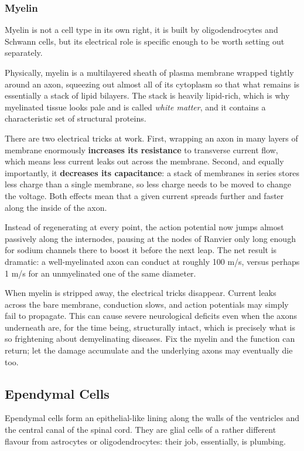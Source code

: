 \documentclass[11pt]{article}
\begin{document}
\subsubsection{Myelin}

Myelin is not a cell type in its own right, it is built by oligodendrocytes and Schwann cells, but its electrical role is specific enough to be worth setting out separately.

Physically, myelin is a multilayered sheath of plasma membrane wrapped tightly around an axon, squeezing out almost all of its cytoplasm so that what remains is essentially a stack of lipid bilayers. The stack is heavily lipid-rich, which is why myelinated tissue looks pale and is called \textit{white matter}, and it contains a characteristic set of structural proteins.

There are two electrical tricks at work. First, wrapping an axon in many layers of membrane enormously \textbf{increases its resistance} to transverse current flow, which means less current leaks out across the membrane. Second, and equally importantly, it \textbf{decreases its capacitance}: a stack of membranes in series stores less charge than a single membrane, so less charge needs to be moved to change the voltage. Both effects mean that a given current spreads further and faster along the inside of the axon.

Instead of regenerating at every point, the action potential now jumps almost passively along the internodes, pausing at the nodes of Ranvier only long enough for sodium channels there to boost it before the next leap. The net result is dramatic: a well-myelinated axon can conduct at roughly 100 m/s, versus perhaps 1 m/s for an unmyelinated one of the same diameter.

When myelin is stripped away, the electrical tricks disappear. Current leaks across the bare membrane, conduction slows, and action potentials may simply fail to propagate. This can cause severe neurological deficits even when the axons underneath are, for the time being, structurally intact, which is precisely what is so frightening about demyelinating diseases. Fix the myelin and the function can return; let the damage accumulate and the underlying axons may eventually die too.

\subsection{Ependymal Cells}

Ependymal cells form an epithelial-like lining along the walls of the ventricles and the central canal of the spinal cord. They are glial cells of a rather different flavour from astrocytes or oligodendrocytes: their job, essentially, is plumbing.
\end{document}
